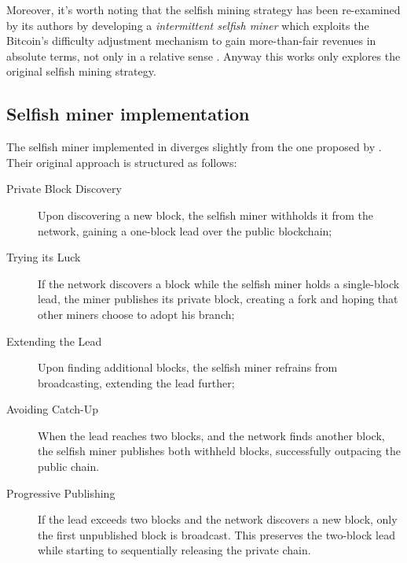 Moreover, it's worth noting that the selfish mining strategy has been
re-examined by its authors by developing a \emph{intermittent selfish miner}
which exploits the Bitcoin's difficulty adjustment mechanism to gain
more-than-fair revenues in absolute terms, not only in a relative sense
\cite{intermittent-selfish-mining}. Anyway this works only explores the
original selfish mining strategy.

\subsection{Selfish miner implementation}\label{subsec:selfish-impl}

The selfish miner implemented in \iblock{} diverges slightly from the
one proposed by \citeauthor{selfish-mining}. Their original approach is
structured as follows:
\begin{description}
	\item[Private Block Discovery] Upon discovering a new block, the
		selfish miner withholds it from the network, gaining a
		one-block lead over the public blockchain;
	\item[Trying its Luck] If the network discovers a block while the
		selfish miner holds a single-block lead, the miner publishes
		its private block, creating a fork and hoping that other miners
		choose to adopt his branch;
	\item[Extending the Lead] Upon finding additional blocks, the selfish miner
		refrains from broadcasting, extending the lead further;
	\item[Avoiding Catch-Up] When the lead reaches two blocks, and the
		network finds another block, the selfish miner publishes both
		withheld blocks, successfully outpacing the public chain.
	\item[Progressive Publishing] If the lead exceeds two blocks and the
		network discovers a new block, only the first unpublished block
		is broadcast. This preserves the two-block lead while starting
		to sequentially releasing the private chain.
\end{description}

